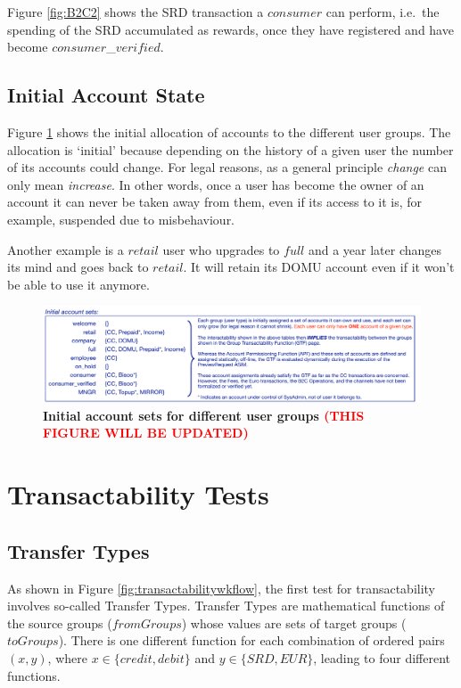 Figure \ref{fig:B2C2} shows the SRD transaction a $consumer$ can perform, i.e.\ the spending of the SRD accumulated as rewards, once they have registered and have become $consumer$\_$verified$.

\subsection{Initial Account State}
Figure \ref{fig:Initial_Acct_Sets} shows the initial allocation of accounts to the different user groups. The allocation is `initial' because  depending on the history of a given user the number of its accounts could change. For legal reasons, as a general principle \emph{change} can only mean \emph{increase}. In other words, once a user has become the owner of an account it can never be taken away from them, even if its access to it is, for example, suspended due to misbehaviour.

Another example is a $retail$ user who upgrades to $full$ and a year later changes its mind and goes back to $retail$. It will retain its DOMU account even if it won't be able to use it anymore.

\begin{figure}[htbp]
\centering
\includegraphics[width=17.5cm]{Figures/Initial_Acct_Sets}
\caption{\small\textbf{Initial account sets for different user groups \textcolor{red}{(THIS FIGURE WILL BE UPDATED)}}}
\label{fig:Initial_Acct_Sets}
\end{figure}

\section{Transactability Tests}
\subsection{Transfer Types}
As shown in Figure \ref{fig:transactabilitywkflow}, the first test for transactability involves so-called Transfer Types. Transfer Types are mathematical functions of the source groups ($fromGroups$) whose values are sets of target groups ($toGroups$). There is one different function for each combination of ordered pairs $(x, y)$, where $x \in \{ credit, debit \}$ and $y \in \{ SRD, EUR \}$, leading to four different functions.

